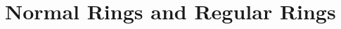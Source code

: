 \documentclass[../main]{subfiles}
\begin{document}
\chapter{Normal Rings and Regular Rings}\label{ch:07}

\setcounter{section}{16}




\end{document}
